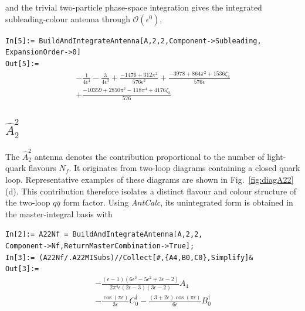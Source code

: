 and the trivial two-particle phase-space integration gives the integrated subleading-colour antenna
through $\mathcal O(\epsilon^0)$,

\begin{mdframed}[backgroundcolor=gray!10, linewidth=0pt]
\texttt{In[5]:= BuildAndIntegrateAntenna[A,2,2,Component->Subleading,\\ExpansionOrder->0]}\\
\hfill
\texttt{Out[5]:=}
    \begin{equation*}
        \begin{gathered}
            -\frac1{4\epsilon^4}-\frac3{4\epsilon^3}+\frac{-1476+312\pi^2}{576\epsilon^2}+\frac{-3978+864\pi^2+1536\zeta_3}{576\epsilon}\\
            +\frac{-10359+2850\pi^2-118\pi^4+4176\zeta_3}{576}
        \end{gathered}
    \end{equation*}
\end{mdframed}


\subsection{$\hat A_2^2$}

The $\hat A_2^2$ antenna denotes the contribution proportional to the number of light-quark flavours
$N_f$. It originates from two-loop diagrams containing a closed quark loop.
Representative examples of these diagrams are shown in Fig.~\ref{fig:diagA22}(d).
This contribution therefore isolates a distinct flavour and colour structure of the two-loop $q\bar q$
form factor. Using \textit{AntCalc}, its unintegrated form is obtained in the master-integral basis
with

\begin{mdframed}[backgroundcolor=gray!10, linewidth=0pt]
\texttt{In[2]:= A22Nf = BuildAndIntegrateAntenna[A,2,2,\\Component->Nf,ReturnMasterCombination->True];}\\
\texttt{In[3]:= (A22Nf/.A22MISubs)//Collect[\#,\{A4,B0,C0\},Simplify]\&}\\
\hfill
\texttt{Out[3]:=}
    \begin{equation*}
        \begin{gathered}
            -\frac{(\epsilon-1)\left(6\epsilon^3-5\epsilon^2+3\epsilon-2\right)}{2\pi^4\epsilon(2\epsilon-3)(3\epsilon-2)}A_4\\
            -\frac{\cos(\pi\epsilon)}{3\epsilon}C_0^\dagger
            -\frac{(3+2\epsilon)\cos(\pi\epsilon)}{6\epsilon}B_0^\dagger
        \end{gathered}
    \end{equation*}
\end{mdframed}

